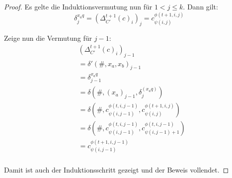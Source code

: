 \begin{proof}
    Es gelte die Induktionsvermutung nun für $1 < j \leq k$. Dann gilt:
    \[
    \delta^{x_a q}_j = (\Delta^{t+1}_{C'}(c)_i)_j = c^{\phi(t + 1, i, j)}_{\psi(i, j)}
    \]
    
    Zeige nun die Vermutung für $j-1$:
    \begin{align*}
        & (\Delta^{t+1}_{C'}(c)_i)_{j-1} \\
        & = \delta'(\#, x_a, x_b)_{j-1} \\
        & = \delta^{x_a q}_{j-1} \\
        & = \delta(\#, (x_a)_{j-1}, \delta^{(x_a q)}_j) \\
        & = \delta(\#, c^{\phi(t, i, j-1)}_{\psi(i, j-1)}, c^{\phi(t + 1, i, j)}_{\psi(i, j)}) \\
        & = \delta(\#, c^{\phi(t, i, j-1)}_{\psi(i, j-1)}, c^{\phi(t, i, j-1)}_{\psi(i, j-1)+1}) \\
        & = c^{\phi(t + 1, i, j-1)}_{\psi(i, j - 1)} \\
    \end{align*}
    
    Damit ist auch der Induktionsschritt gezeigt und der Beweis vollendet.
\end{proof}


